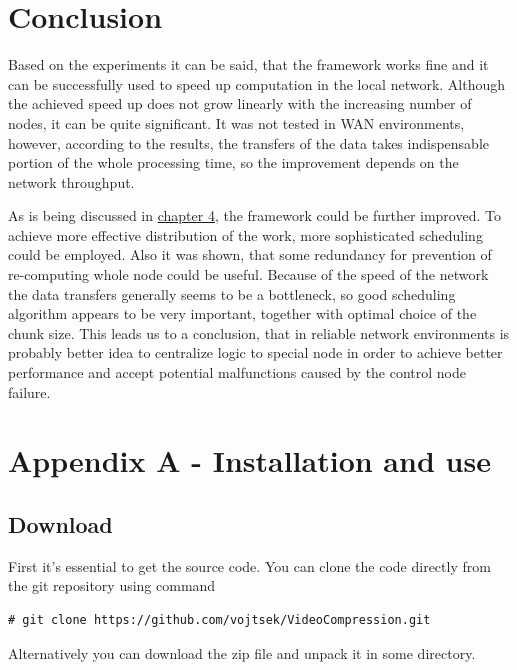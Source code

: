 \chapter*{Conclusion}
Based on the experiments it can be said, that the framework works fine and it can be successfully used to speed up computation in the local network. Although the achieved speed up does not grow linearly with the increasing number of nodes, it can be quite significant. It was not tested in WAN environments, however, according to the results, the transfers of the data takes indispensable portion of the whole processing time, so the improvement depends on the network throughput. 

As is being discussed in \hyperref[Problems-alternatives-and-possible-improvements]{chapter 4}, the framework could be further improved. To achieve more effective distribution of the work, more sophisticated scheduling could be employed. Also it was shown, that some redundancy for prevention of re-computing whole node could be useful. Because of the speed of the network the data transfers generally seems to be a bottleneck, so good scheduling algorithm appears to be very important, together with optimal choice of the chunk size. This leads us to a conclusion, that in reliable network environments is probably better idea to centralize logic to special node in order to achieve better performance and accept potential malfunctions caused by the control node failure.

\chapter*{Appendix A - Installation and use}
\section{Download} 
First it's essential to get the source code. You can clone the code directly from the git repository using command
\begin{verbatim}
# git clone https://github.com/vojtsek/VideoCompression.git
\end{verbatim}
Alternatively you can download the zip file and unpack it in some directory.

